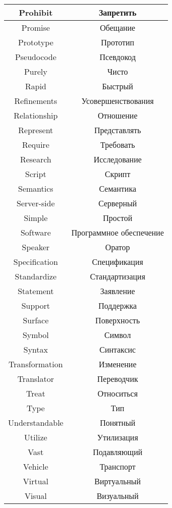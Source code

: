 \begin{table}[h!]
  \centering
  \begin{tabular}{|*{2}{C{.4}|}} \hline
    Prohibit & Запретить \\ \hline
    Promise & Обещание \\ \hline
    Prototype & Прототип \\ \hline
    Pseudocode & Псевдокод \\ \hline
    Purely & Чисто \\ \hline
    Rapid & Быстрый \\ \hline
    Refinements & Усовершенствования \\ \hline
    Relationship & Отношение \\ \hline
    Represent & Представлять \\ \hline
    Require & Требовать \\ \hline
    Research & Исследование \\ \hline
    Script & Скрипт \\ \hline
    Semantics & Семантика \\ \hline
    Server-side & Серверный \\ \hline
    Simple & Простой \\ \hline
    Software & Программное обеспечение \\ \hline
    Speaker & Оратор \\ \hline
    Specification & Спецификация \\ \hline
    Standardize & Стандартизация \\ \hline
    Statement & Заявление \\ \hline
    Support & Поддержка \\ \hline
    Surface & Поверхность \\ \hline
    Symbol & Символ \\ \hline
    Syntax & Синтаксис \\ \hline
    Transformation & Изменение \\ \hline
    Translator & Переводчик \\ \hline
    Treat & Относиться \\ \hline
    Type & Тип \\ \hline
    Understandable & Понятный \\ \hline
    Utilize & Утилизация \\ \hline    
    Vast & Подавляющий \\ \hline
    Vehicle & Транспорт\\ \hline
    Virtual & Виртуальный \\ \hline
    Visual & Визуальный \\ \hline
  \end{tabular}
\end{table}
